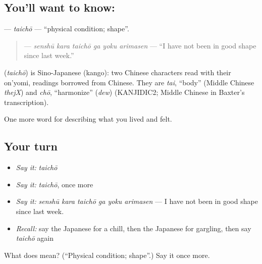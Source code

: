 \subsection*{You'll want to know: }
\textbf{} — \emph{taichō} — \textquotedblleft{}physical condition; shape\textquotedblright{}.

\begin{quote}
\textbf{   } — \emph{senshū kara taichō ga yoku arimasen} — \textquotedblleft{}I have not been in good shape since last week.\textquotedblright{}
\end{quote}

\begin{cousinweb}
\textbf{} (\emph{taichō}) is Sino-Japanese (kango): two Chinese characters read with their on'yomi, readings borrowed from Chinese. They are \emph{tai}, \textquotedblleft{}body\textquotedblright{} (Middle Chinese \emph{thejX}) and \emph{chō}, \textquotedblleft{}harmonize\textquotedblright{} (\emph{dew}) (KANJIDIC2; Middle Chinese in Baxter's transcription).
\end{cousinweb}

\begin{grammarlens}[title={What you've built}]
One more word for describing what you lived and felt.
\end{grammarlens}

\subsection*{Your turn}
\begin{itemize}
\raggedright
  \item \emph{Say it:} \emph{taichō}
  \item \emph{Say it:} \emph{taichō}, once more
  \item \emph{Say it:} \emph{senshū kara taichō ga yoku arimasen} — I have not been in good shape since last week.
  \item \emph{Recall:} say the Japanese for a chill, then the Japanese for gargling, then say \emph{taichō} again
\end{itemize}

\begin{tcolorbox}[breakable,colback=teal!4,colframe=teal!35!black,title={Before you move on}]
What does  mean? (\textquotedblleft{}Physical condition; shape\textquotedblright{}.) Say it once more.
\end{tcolorbox}
